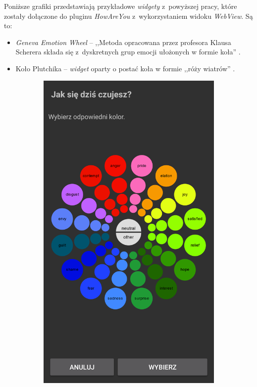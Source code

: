 \begin{itemize}
	Poniższe grafiki przedstawiają przykładowe \textit{widgety} z~powyższej pracy, które zostały dołączone do pluginu \textit{HowAreYou} z~wykorzystaniem widoku \textit{WebView}. Są to:
	
	\begin{itemize}
		\item \textit{Geneva Emotion Wheel} -- ,,Metoda opracowana przez profesora Klausa Scherera składa się z~dyskretnych grup emocji ułożonych w formie koła'' \cite{ArkadiuszLis}.
		
		\item Koło Plutchika -- \textit{widget} oparty o postać koła w formie ,,róży wiatrów'' \cite{ArkadiuszLis}.
	\end{itemize}
	\clearpage
	
	\begin{figure}[H]
		\centering
		\begin{subfigure}{0.35\textwidth}
			\centering
			\includegraphics[scale=0.22]{rozdzial6/jspsych-geneva-wheel.png}

\end{subfigure}
\end{figure}
\end{itemize}
